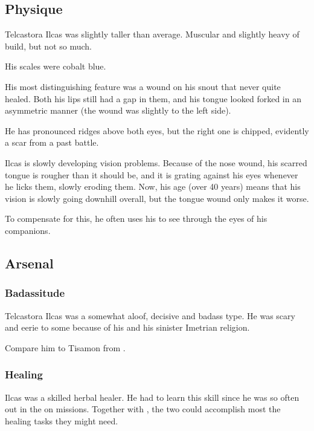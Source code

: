 \subsection{Physique}
Telcastora Ilcas was slightly taller than average.
Muscular and slightly heavy of build, but not so much.

His scales were cobalt blue. 

His most distinguishing feature was a wound on his snout that never quite healed. 
Both his lips still had a gap in them, and his tongue looked forked in an asymmetric manner (the wound was slightly to the left side). 

He has pronounced ridges above both eyes, but the right one is chipped, evidently a scar from a past battle.

Ilcas is slowly developing vision problems. Because of the nose wound, his scarred tongue is rougher than it should be, and it is grating against his eyes whenever he licks them, slowly eroding them. Now, his age (over 40 years) means that his vision is slowly going downhill overall, but the tongue wound only makes it worse. 

To compensate for this, he often uses his  to see through the eyes of his \nycan{} companions. 










\subsection{Arsenal}





\subsubsection{Badassitude}
Telcastora Ilcas was a somewhat aloof, decisive and badass type. 
He was scary and eerie to some because of his  and his sinister Imetrian religion. 

Compare him to Tisamon from \cite{AdrianTchaikovsky:ShadowsoftheApt}. 




\subsubsection{Healing}
Ilcas was a skilled herbal healer. 
He had to learn this skill since he was so often out in the \Wylde{} on missions. 
Together with , the two could accomplish most the healing tasks they might need. 




